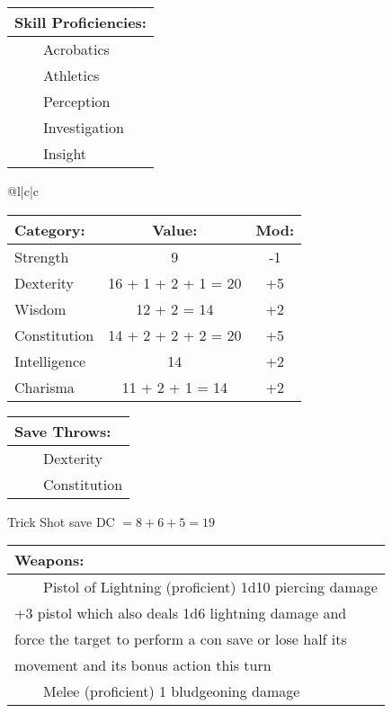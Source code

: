\documentclass[11pt]{article}
\newcommand{\tabitem}{~~\llap{--}~~}
\begin{document}
\begin{multicols}{2}
\vspace{2mm}

\noindent \begin{tabularx}{\linewidth}{@{}l}
{\Large \textbf{Skill Proficiencies:}} \\
\hline
\tabitem Acrobatics \\
\tabitem Athletics \\
\tabitem Perception \\
\tabitem Investigation \\
\tabitem Insight
		\end{tabularx}

\vspace{4mm}

\noindent \begin{tabularx}{\linewidth}{@{}l|c|c}
 \\
\hline
		\end{tabularx}
\noindent \begin{tabular}{@{}l|c|c}
\textbf{Category:} 			& \textbf{Value:} 	& \textbf{Mod:} \\
\hline
Strength 					& 9 						& -1		\\
Dexterity 					& 16 + 1 + 2 + 1 = 20 		& +5		\\
Wisdom 						& 12 + 2 = 14				& +2		\\
Constitution 				& 14 + 2 + 2 + 2 = 20		& +5		\\
Intelligence 				& 14 						& +2		\\
Charisma 					& 11 + 2 + 1 = 14			& +2
		\end{tabular}

\vspace{4mm}

\noindent \begin{tabularx}{\linewidth}{@{}l}
{\Large \textbf{Save Throws:}} \\
\hline
\tabitem Dexterity \\
\tabitem Constitution \\
		\end{tabularx}
\noindent Trick Shot save DC $= 8 + 6 + 5 = 19$

\vspace{4mm}

\noindent \begin{tabularx}{\linewidth}{@{}l}
{\Large \textbf{Weapons:}} \\
\hline
\tabitem Pistol of Lightning (proficient) 1d10 piercing damage \\
+3 pistol which also deals 1d6 lightning damage and \\
force the target to perform a con save or lose half its \\
movement and its bonus action this turn \\
\tabitem Melee (proficient) 1 bludgeoning damage
		\end{tabularx}


\end{multicols}
\end{document}
